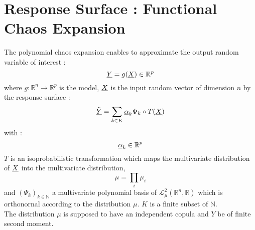 

\newpage

\section{Response Surface : Functional Chaos Expansion}
The polynomial chaos expansion enables to approximate the output random variable of interest :
\begin{equation}\label{Model}
{\underline{Y}} = g({\underline{X}}) \in \mathbb{R}^p
\end{equation}
  where  $g : \mathbb{R}^n \longrightarrow \mathbb{R}^p $ is the model, ${\underline{X}}$ is the input random vector of dimension $n$ by the  response surface :
\begin{equation}\label{metaModel}
\tilde{{\underline{Y}}} = \sum_{k \in K} {\underline{\alpha}}_k \Psi_k \circ T({\underline{X}})
\end{equation}
with : 
\begin{equation}\label{coeff} 
{\underline{\alpha}}_k \in \mathbb{R}^p
\end{equation}
 $T$ is an isoprobabilistic transformation which maps the multivariate distribution of ${\underline{X}}$ into the multivariate distribution,  
\begin{equation}\label{mudist} 
\mu = \prod_i \mu_i 
\end{equation} 
and  $(\Psi_k)_{k \in \mathbb{N}}$ a multivariate polynomial basis of $\mathcal{L}^2_{\mu}(\mathbb{R}^n,\mathbb{R})$ which is orthonornal according to the distribution $\mu$. $K$ is a finite subset of $\mathbb{N}$. \\
The distribution $\mu$ is supposed to have an independent copula and $Y$ be of finite second moment.

